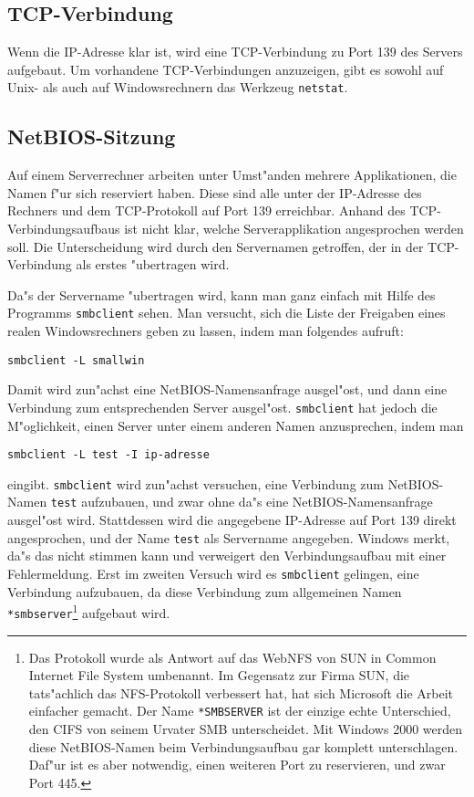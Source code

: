 \documentclass{scrartcl}
\newcommand{\prog}{\texttt}
\begin{document}
\subsection*{TCP-Verbindung}

Wenn die IP-Adresse klar ist, wird eine TCP-Verbindung zu Port 139 des
Servers aufgebaut. Um vorhandene TCP-Verbindungen anzuzeigen, gibt es
sowohl auf Unix- als auch auf Windowsrechnern das Werkzeug
\prog{netstat}.

\subsection*{NetBIOS-Sitzung}

Auf einem Serverrechner arbeiten unter Umst"anden mehrere
Applikationen, die Namen f"ur sich reserviert haben. Diese sind alle
unter der IP-Adresse des Rechners und dem TCP-Protokoll auf Port 139
erreichbar. Anhand des TCP-Verbindungsaufbaus ist nicht klar, welche
Serverapplikation angesprochen werden soll. Die Unterscheidung wird
durch den Servernamen getroffen, der in der TCP-Verbindung als erstes
"ubertragen wird.

Da"s der Servername "ubertragen wird, kann man ganz einfach mit Hilfe
des Programms \prog{smbclient} sehen. Man versucht, sich die Liste der
Freigaben eines realen Windowsrechners geben zu lassen, indem man
folgendes aufruft:

\verb|smbclient -L smallwin|

Damit wird zun"achst eine NetBIOS-Namensanfrage ausgel"ost, und dann
eine Verbindung zum entsprechenden Server ausgel"ost. \prog{smbclient}
hat jedoch die M"oglichkeit, einen Server unter einem anderen Namen
anzusprechen, indem man

\verb|smbclient -L test -I ip-adresse|

\noindent
eingibt. \prog{smbclient} wird zun"achst versuchen, eine Verbindung
zum NetBIOS-Namen \texttt{test} aufzubauen, und zwar ohne da"s eine
NetBIOS-Namensanfrage ausgel"ost wird. Stattdessen wird die angegebene
IP-Adresse auf Port 139 direkt angesprochen, und der Name
\texttt{test} als Servername angegeben. Windows merkt, da"s das nicht
stimmen kann und verweigert den Verbindungsaufbau mit einer
Fehlermeldung. Erst im zweiten Versuch wird es \prog{smbclient}
gelingen, eine Verbindung aufzubauen, da diese Verbindung zum
allgemeinen Namen \texttt{*smbserver}\footnote{Das Protokoll wurde als
Antwort auf das WebNFS von SUN in Common Internet File System umbenannt.
Im Gegensatz zur Firma SUN, die tats"achlich das NFS-Protokoll verbessert
hat, hat sich Microsoft die Arbeit einfacher gemacht. Der Name
\texttt{*SMBSERVER} ist der einzige echte Unterschied, den CIFS von
seinem Urvater SMB unterscheidet. Mit Windows 2000 werden diese
NetBIOS-Namen beim Verbindungsaufbau gar komplett unterschlagen.
Daf"ur ist es aber notwendig, einen weiteren Port zu reservieren, und
zwar Port 445.} aufgebaut wird.
\end{document}
